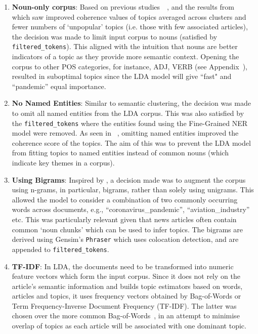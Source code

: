 \begin{enumerate}
  \item \textbf{Noun-only corpus}: Based on previous studies~\cite{nouns_only_lda}~\cite{efficient_noun_only_approach}, and the results from~ which saw improved coherence values of topics averaged across clusters and fewer numbers of `unpopular' topics (i.e. those with few associated articles), the decision was made to limit input corpus to nouns (satisfied by \texttt{filtered\_tokens}). This aligned with the intuition that nouns are better indicators of a topic as they provide more semantic context. Opening the corpus to other POS categories, for instance, ADJ, VERB (see Appendix~), resulted in suboptimal topics since the LDA model will give ``fast" and ``pandemic'' equal importance.
  
  \item \textbf{No Named Entities}: Similar to semantic clustering, the decision was made to omit all named entities from the LDA corpus. This was also satisfied by the \texttt{filtered\_tokens} where the entities found using the Fine-Grained NER model were removed. As seen in ~, omitting named entities improved the coherence score of the topics. The aim of this was to prevent the LDA model from fitting topics to named entities instead of common nouns (which indicate key themes in a corpus).
  
  \item \textbf{Using Bigrams}: Inspired by \cite[`Beyond bag of words']{bigrams_lda}, a decision made was to augment the corpus using n-grams, in particular, bigrams, rather than solely using unigrams. This allowed the model to consider a combination of two commonly occurring words across documents, e.g., ``coronavirus\_pandemic'', ``aviation\_industry'' etc. This was particularly relevant given that news articles often contain common `noun chunks' which can be used to infer topics. The bigrams are derived using Gensim's \texttt{Phraser} which uses colocation detection, and are appended to \texttt{filtered\_tokens}.
  
  \item \textbf{TF-IDF}: In LDA, the documents need to be transformed into numeric feature vectors which form the input corpus. Since it does not rely on the article's semantic information and builds topic estimators based on words, articles and topics, it uses frequency vectors obtained by Bag-of-Words or Term Frequency-Inverse Document Frequency (TF-IDF). The latter was chosen over the more common Bag-of-Words~\cite{topic_models}, in an attempt to minimise overlap of topics as each article will be associated with one dominant topic.
\end{enumerate}


